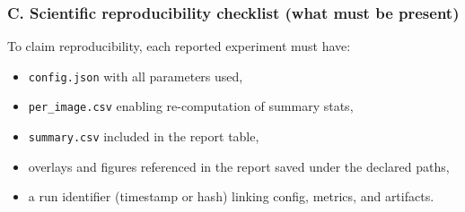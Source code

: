 \subsubsection*{C. Scientific reproducibility checklist (what must be present)}
To claim reproducibility, each reported experiment must have:
\begin{itemize}
  \item \texttt{config.json} with all parameters used,
  \item \texttt{per\_image.csv} enabling re-computation of summary stats,
  \item \texttt{summary.csv} included in the report table,
  \item overlays and figures referenced in the report saved under the declared paths,
  \item a run identifier (timestamp or hash) linking config, metrics, and artifacts.
\end{itemize}

